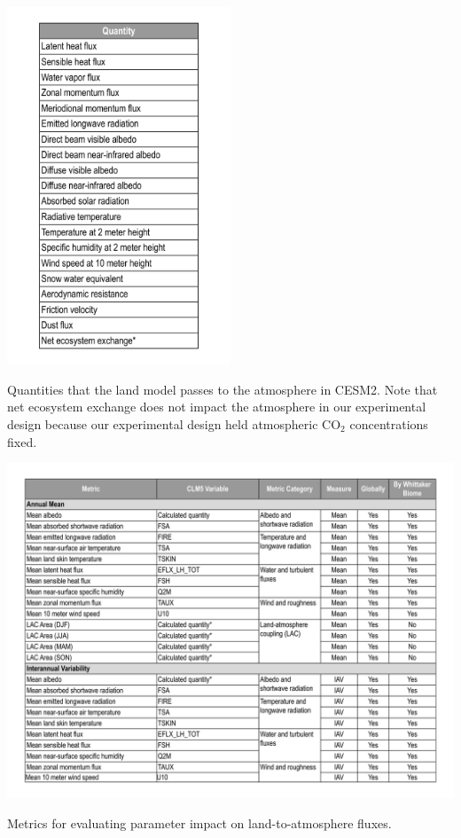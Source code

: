 \documentclass[draft, grl]{agujournal2019}
\begin{document}
\captionsetup[table]{format=cancaption,labelformat=cancaptionlabel}
 \begin{table}[htb!]
 \centering
\noindent\includegraphics[width=0.5\textwidth]{writing/figs/Table_Land2Atm_Quantities.pdf}
  \caption{Quantities that the land model passes to the atmosphere in CESM2. \footnotesize{Note that net ecosystem exchange does not impact the atmosphere in our experimental design because our experimental design held atmospheric CO$_2$ concentrations fixed.}}
 \label{table:metrics_of_impact}
 \end{table}

\begin{table}[htb!]
\noindent\includegraphics[width=\textwidth]{writing/figs/Table_Quantities_Used_In_Parameter_Selection.pdf}
  \caption{Metrics for evaluating parameter impact on land-to-atmosphere fluxes.}
 \label{table:land2atm_fluxes}
 \end{table}
\end{document}
